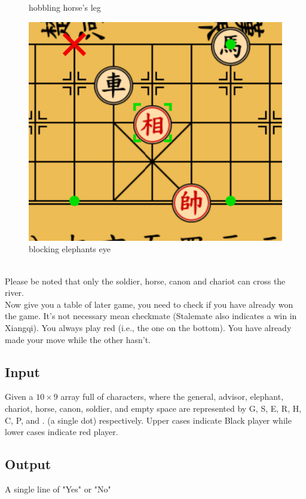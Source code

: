 \documentclass[12pt,a4paper]{article}
\begin{document}
\begin{figure}[htbp]
\begin{minipage}[b]{0.25\textwidth}
        \caption{hobbling horse's leg}
    \end{minipage}
    \begin{minipage}[b]{0.27\textwidth}
        \centering
        \includegraphics[width=\linewidth]{Xiangqi.assets/Elephant_movement.png}
        \caption{blocking elephant\textquotesingle s eye}
    \end{minipage}
\end{figure}
\\
\noindent
Please be noted that only the soldier, horse, canon and chariot can cross the river.
\\
\noindent
Now give you a table of later game, you need to check if you have already won the game. It's not necessary mean checkmate (Stalemate also indicates a win in Xiangqi).
You always play red (i.e., the one on the bottom). You have already made your move while the other hasn't.
\subsection*{\fontsize{16}{12}Input}
Given a $10\times9$ array full of characters, where the general, advisor, elephant, chariot, horse, canon, soldier, and empty space are represented by G, S, E, R, H, C, P, and . (a single dot) respectively. Upper cases indicate Black player while lower cases indicate red player.
\subsection*{\fontsize{16}{12}Output}
A single line of "Yes" or "No"
\end{document}
